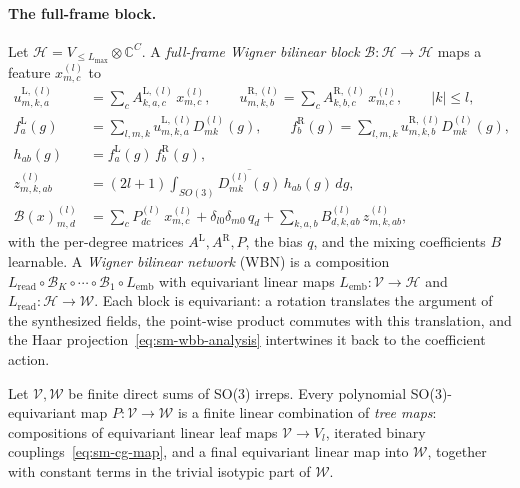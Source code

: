 \paragraph{The full-frame block.}
Let $\mathcal{H}=V_{\le L_{\max}}\otimes\mathbb{C}^{C}$.
A \emph{full-frame Wigner bilinear block} $\mathcal{B}:\mathcal{H}\to\mathcal{H}$ maps a feature $x^{(l)}_{m,c}$ to
\begin{align}
    u^{\mathrm{L},(l)}_{m,k,a}
     & =\sum_{c}
    A^{\mathrm{L},(l)}_{k,a,c}\,x^{(l)}_{m,c}, \qquad u^{\mathrm{R},(l)}_{m,k,b} =\sum_{c}A^{\mathrm{R},(l)}_{k,b,c}\,x^{(l)}_{m,c}, \qquad |k|\le l, \label{eq:sm-wbb-lin} \\ f^{\mathrm{L}}_{a}(g) &=\sum_{l,m,k}u^{\mathrm{L},(l)}_{m,k,a}D^{(l)}_{mk}(g), \qquad f^{\mathrm{R}}_{b}(g) =\sum_{l,m,k}u^{\mathrm{R},(l)}_{m,k,b}D^{(l)}_{mk}(g), \label{eq:sm-wbb-synth}\\ h_{ab}(g) &=f^{\mathrm{L}}_{a}(g)\,f^{\mathrm{R}}_{b}(g), \label{eq:sm-wbb-prod}\\ z^{(l)}_{m,k,ab} &=(2l+1)\int_{SO(3)}\overline{D^{(l)}_{mk}(g)}\,h_{ab}(g)\,dg, \label{eq:sm-wbb-analysis}\\ \mathcal{B}(x)^{(l)}_{m,d} &=\sum_{c}P^{(l)}_{dc}\,x^{(l)}_{m,c} +\delta_{l0}\delta_{m0}\,q_{d} +\sum_{k,a,b}B^{(l)}_{d,k,ab}\,z^{(l)}_{m,k,ab}, \label{eq:sm-wbb-out}\end{align} with the per-degree matrices $A^{\mathrm{L}},A^{\mathrm{R}},P$, the bias $q$, and the mixing coefficients $B$ learnable.
A \emph{Wigner bilinear network} (WBN) is a composition $L_{\mathrm{read}}\circ\mathcal{B}_{K}\circ\cdots\circ\mathcal{B}_{1}\circ L_{\mathrm{emb}}$ with equivariant linear maps $L_{\mathrm{emb}}:\mathcal{V}\to\mathcal{H}$ and $L_{\mathrm{read}}:\mathcal{H}\to\mathcal{W}$.
Each block is equivariant: a rotation translates the argument of the synthesized fields, the point-wise product commutes with this translation, and the Haar projection~\eqref{eq:sm-wbb-analysis} intertwines it back to the coefficient action.

\begin{lemma}
    \label{lem:sm-cg-span}
    Let $\mathcal{V},\mathcal{W}$ be finite direct sums of SO(3) irreps.
    Every polynomial SO(3)-equivariant map $P:\mathcal{V}\to\mathcal{W}$ is a finite linear combination of \emph{tree maps}: compositions of equivariant linear leaf maps $\mathcal{V}\to V_{l}$, iterated binary couplings~\eqref{eq:sm-cg-map}, and a final equivariant linear map into $\mathcal{W}$, together with constant terms in the trivial isotypic part of $\mathcal{W}$.
\end{lemma}

